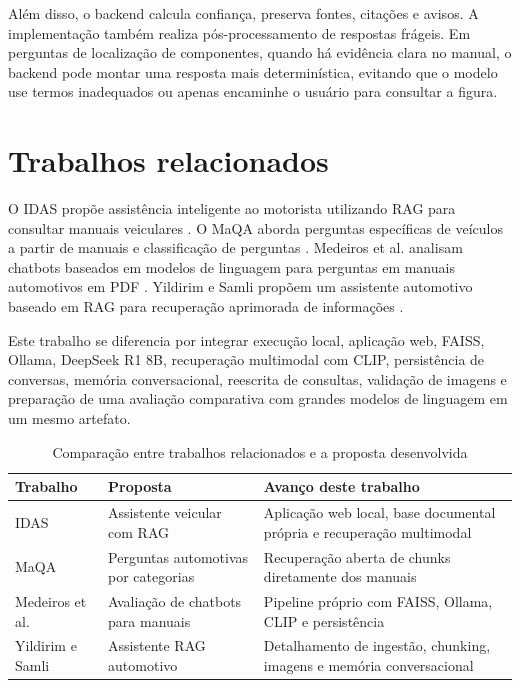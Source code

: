 Além disso, o backend calcula confiança, preserva fontes, citações e avisos. A implementação também realiza pós-processamento de respostas frágeis. Em perguntas de localização de componentes, quando há evidência clara no manual, o backend pode montar uma resposta mais determinística, evitando que o modelo use termos inadequados ou apenas encaminhe o usuário para consultar a figura.

\section{Trabalhos relacionados}

O IDAS propõe assistência inteligente ao motorista utilizando RAG para consultar manuais veiculares \cite{hernandez2024idas}. O MaQA aborda perguntas específicas de veículos a partir de manuais e classificação de perguntas \cite{park2024maqa}. Medeiros et al. analisam chatbots baseados em modelos de linguagem para perguntas em manuais automotivos em PDF \cite{medeiros2023automotive}. Yildirim e Samli propõem um assistente automotivo baseado em RAG para recuperação aprimorada de informações \cite{yildirim2025rag}.

Este trabalho se diferencia por integrar execução local, aplicação web, FAISS, Ollama, DeepSeek R1 8B, recuperação multimodal com CLIP, persistência de conversas, memória conversacional, reescrita de consultas, validação de imagens e preparação de uma avaliação comparativa com grandes modelos de linguagem em um mesmo artefato.

\begin{table}[H]
\centering
\caption{Comparação entre trabalhos relacionados e a proposta desenvolvida}
\label{tab:relacionados}
\begin{tabular}{p{3cm}p{4cm}p{6cm}}
\hline
Trabalho & Proposta & Avanço deste trabalho \\
\hline
IDAS & Assistente veicular com RAG & Aplicação web local, base documental própria e recuperação multimodal \\
MaQA & Perguntas automotivas por categorias & Recuperação aberta de chunks diretamente dos manuais \\
Medeiros et al. & Avaliação de chatbots para manuais & Pipeline próprio com FAISS, Ollama, CLIP e persistência \\
Yildirim e Samli & Assistente RAG automotivo & Detalhamento de ingestão, chunking, imagens e memória conversacional \\
\hline
\end{tabular}
\end{table}
